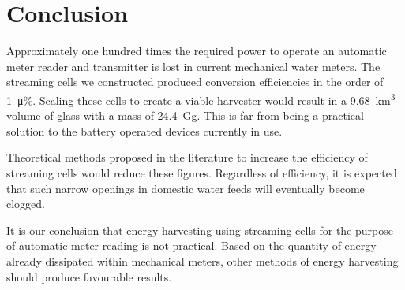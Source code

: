 \documentclass[10pt,final,journal]{IEEEtran}
\begin{document}
    \section{Conclusion}
    \label{sect:conclusion}
    Approximately one hundred times the required power to operate an automatic meter reader and transmitter is lost in current mechanical water meters.
    The streaming cells we constructed produced conversion efficiencies in the order of \SI{1}{\micro\percent}.
    Scaling these cells to create a viable harvester would result in a \SI{9.68}{\cubic\kilo\metre} volume of glass with a mass of \SI{24.4}{\giga\gram}.
    This is far from being a practical solution to the battery operated devices currently in use.

    Theoretical methods proposed in the literature to increase the efficiency of streaming cells would reduce these figures.
    Regardless of efficiency, it is expected that such narrow openings in domestic water feeds will eventually become clogged.

    It is our conclusion that energy harvesting using streaming cells for the purpose of automatic meter reading is not practical.
    Based on the quantity of energy already dissipated within mechanical meters, other methods of energy harvesting should produce favourable results.
    
    
\end{document}
